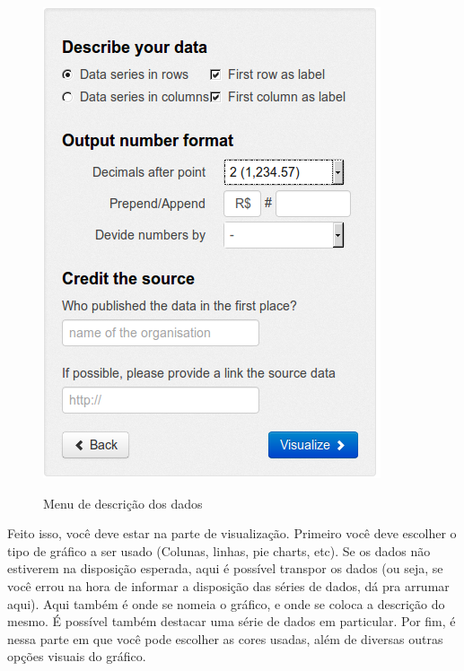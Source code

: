 \documentclass[12pt,onecolumn]{article}
\begin{document}
    
    \begin{figure}[H]
      \begin{center}
        \includegraphics[scale = 0.5]{datawrapper-describe.png}
        \label{fig:datawrapper-describe}
        \caption{Menu de descrição dos dados}
      \end{center}
    \end{figure}
    
    Feito isso, você deve estar na parte de visualização. Primeiro você deve escolher
    o tipo de gráfico a ser usado (Colunas, linhas, pie charts, etc). Se os dados não
    estiverem na disposição esperada, aqui é possível transpor os dados (ou seja, se
    você errou na hora de informar a disposição das séries de dados, dá pra arrumar 
    aqui). Aqui também é onde se nomeia o gráfico, e onde se coloca a descrição do
    mesmo. É possível também destacar uma série de dados em particular. Por fim, 
    é nessa parte em que você pode escolher as cores usadas, além de diversas outras
    opções visuais do gráfico.
    
\end{document}
